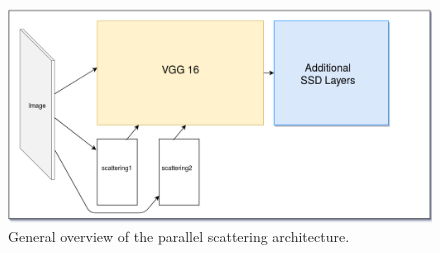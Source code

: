 \begin{figure}[!htb]
	\centering
	\includegraphics[width=\textwidth]{images/parallel_scattering_overview.png}
	\caption{General overview of the parallel scattering architecture.}
	\label{fig:parallel_scattering_overview}	
\end{figure}

